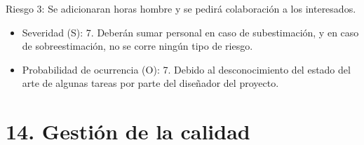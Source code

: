 \documentclass[11pt, %
codirector, %
]{charter}
\begin{document}
Riesgo 3: Se adicionaran horas hombre y se pedirá colaboración a los interesados.
\begin{itemize}
	\item Severidad (S): 7. \newline 
	Deberán sumar personal en caso de subestimación, y en caso de sobreestimación, no se corre ningún tipo de riesgo.
	\item Probabilidad de ocurrencia (O): 7.  \newline
	Debido al desconocimiento del estado del arte de algunas tareas por parte del diseñador del proyecto.  
\end{itemize}






\section{14. Gestión de la calidad}
\label{sec:calidad}
\end{document}
